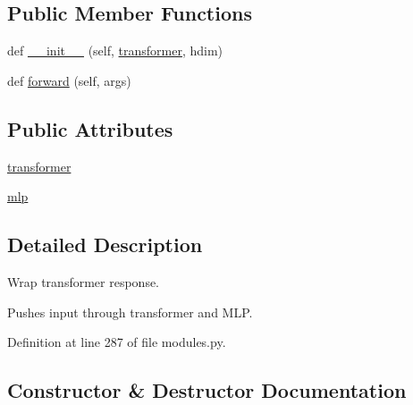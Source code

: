 \subsection*{Public Member Functions}
\begin{DoxyCompactItemize}
\item 
def \hyperlink{classparlai_1_1agents_1_1transformer_1_1modules_1_1TransformerResponseWrapper_ab078bf40bb275ebd56b4e205923ab827}{\+\_\+\+\_\+init\+\_\+\+\_\+} (self, \hyperlink{classparlai_1_1agents_1_1transformer_1_1modules_1_1TransformerResponseWrapper_ae757bd573993a3ca4a31e9d65b1a7e9a}{transformer}, hdim)
\item 
def \hyperlink{classparlai_1_1agents_1_1transformer_1_1modules_1_1TransformerResponseWrapper_ad716cb3a5874f46b1aa4beb45ba1b944}{forward} (self, args)
\end{DoxyCompactItemize}
\subsection*{Public Attributes}
\begin{DoxyCompactItemize}
\item 
\hyperlink{classparlai_1_1agents_1_1transformer_1_1modules_1_1TransformerResponseWrapper_ae757bd573993a3ca4a31e9d65b1a7e9a}{transformer}
\item 
\hyperlink{classparlai_1_1agents_1_1transformer_1_1modules_1_1TransformerResponseWrapper_a11ccb5cd5d1b5236b08c904bdeb9e041}{mlp}
\end{DoxyCompactItemize}


\subsection{Detailed Description}
\begin{DoxyVerb}Wrap transformer response.

Pushes input through transformer and MLP.
\end{DoxyVerb}
 

Definition at line 287 of file modules.\+py.



\subsection{Constructor \& Destructor Documentation}
\mbox{\label{classparlai_1_1agents_1_1transformer_1_1modules_1_1TransformerResponseWrapper_ab078bf40bb275ebd56b4e205923ab827}} 
